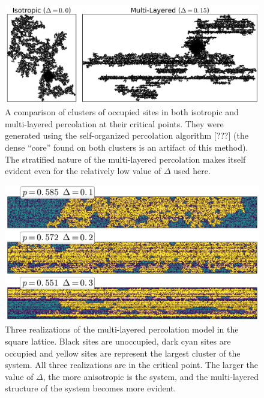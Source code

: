 \begin{figure}
\begin{center}
    \includegraphics[scale=0.6]{chapters/ch5-anis/figs/mlp_cluster}
\end{center}
\caption{A comparison of clusters of occupied sites in both isotropic and
    multi-layered percolation at their critical points. They were generated
    using the self-organized percolation algorithm [???] (the dense ``core''
    found on both clusters is an artifact of this method). The stratified
    nature of the multi-layered percolation makes itself evident even for the
    relatively low value of $\Delta$ used here.}
\label{fig:mlp_cluster}
\end{figure}

\begin{figure}
\begin{center}
    \includegraphics[scale=0.6]{chapters/ch5-anis/figs/mlperco}
\end{center}
\caption{Three realizations of the multi-layered percolation model in the
    square lattice. Black sites are unoccupied, dark cyan sites are occupied
    and yellow sites are represent the largest cluster of the system. All
    three realizations are in the critical point. The larger the value of
    $\Delta$, the more anisotropic is the system, and the multi-layered
    structure of the system becomes more evident.}
\label{fig:mlperco}
\end{figure}

